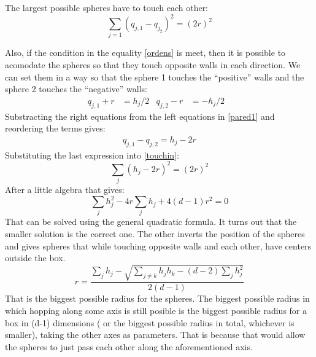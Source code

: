 \documentclass[superscriptaddress,pre,reprint,showpacs,onecolumn]{revtex4-1}
\begin{document}
The largest possible spheres have to touch each other:
\begin{equation}\label{touchin}
  \sum_{j=1}(q_{j,1}-q_{j_2})^2=(2 r)^2
\end{equation}

Also, if the condition in the equality \ref{ordens} is meet, then
it is possible to acomodate the spheres so that they touch opposite walls in
each direction. We can set them in a way so that the sphere 1 touches the
``positive'' walls and the sphere 2 touches the ``negative'' walls:
\begin{align}\label{pared1}
  q_{j,1}+r & =h_j/2 & q_{j,2}-r & =-h_j/2 &
\end{align}
Substracting the right equations from the left equations in \ref{pared1}
and reordering the terms gives:
\begin{align}
  q_{j,1}-q_{j,2}=h_j-2r
\end{align}
Substituting the last expression into \ref{touchin}:
\begin{equation}
  \sum_j(h_j-2r)^2=(2r)^2
\end{equation}
After a little algebra that gives:
\begin{equation}
  \sum_j h_j^2 -4r\sum_j h_j + 4(d-1)r^2=0
\end{equation}
That can be solved using the general quadratic formula.
It turns out that the smaller solution is the correct one. The other
inverts the position of the spheres and gives spheres that while
touching opposite walls and each other, have centers outside the box.
\begin{equation}\label{rmax}
  r=\frac{\sum_j h_j - \sqrt{\sum_{j\neq k}h_j h_k-(d-2)\sum_j{h_j^2}}}{2(d-1)}
\end{equation}
That is the biggest possible radius for the spheres.
The biggest possible radius in which hopping along some axis is still
posible is the biggest possible radius for a box in (d-1) dimensions
( or the biggest possible radius in total, whichever is smaller),
taking the other axes as parameters. That is because that would allow
the spheres to just pass each other along the aforementioned axis.
\end{document}
